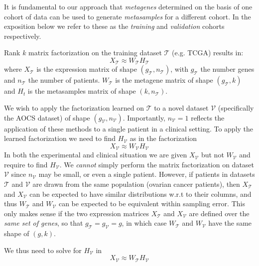 \documentclass[draft,tikz, 12pt,a4paper,oneside,fleqn]{article}
\begin{document}
\newcommand{\trainset}{\mathcal{T}}
\newcommand{\validset}{\mathcal{V}}

It is fundamental to our approach that \emph{metagenes} determined on the basis of one cohort of data can be used to generate \emph{metasamples} for a different cohort.  In the exposition below we refer to these as the \emph{training} and \emph{validation} cohorts respectively.

Rank $k$ matrix factorization on the training dataset $\trainset$ (e.g. TCGA) results in:
\begin{equation}
 X_\trainset \approx W_\trainset H_\trainset
\end{equation}
where $X_\trainset$ is the expression matrix of shape $(g_\trainset, n_\trainset)$, with $g_\trainset$ the number genes and $n_\trainset$ the number of patients. $W_\trainset$ is the metagene matrix of shape $(g_\trainset, k)$ and $H_t$ is the metasamples matrix of shape $(k, n_\trainset)$.

We wish to apply the factorization learned on $\trainset$ to a novel dataset $\validset$ (specifically the AOCS dataset) of shape $(g_\validset, n_\validset)$. 
Importantly, $n_\validset = 1$ reflects the application of these methods to a single patient in a clinical setting.  To apply the learned factorization we need to find $H_\validset$ as in the factorization
\begin{equation}
	X_\validset \approx W_\validset H_\validset
\end{equation}
In both the experimental and clinical situation we are given $X_\validset$ but not $W_\validset$ and require to find $H_\validset$. 
We \emph{cannot} simply perform the matrix factorization on dataset $\validset$ since $n_\validset$ may be small, or even a single patient.   
However, if patients in datasets $\trainset$ and $\validset$ are drawn from the same population (ovarian cancer patients), then $X_\trainset$ and $X_\validset$ can be expected to have similar distributions w.r.t to their columns, and thus $W_\trainset$ and $W_\validset$ can be expected to be equivalent within sampling error.  
This only makes sense if the two expression matrices $X_\trainset$ and $X_\validset$ are defined over the \emph{same set of genes}, so that $g_\trainset = g_\validset = g$, in which case $W_\trainset$ and $W_\validset$ have the same shape of $(g, k)$.   

We thus need to solve for $H_\validset$ in
\begin{equation}
	X_\validset  \approx  W_\trainset H_\validset \label{eq_Xv_WtHv}
\end{equation}
\end{document}
